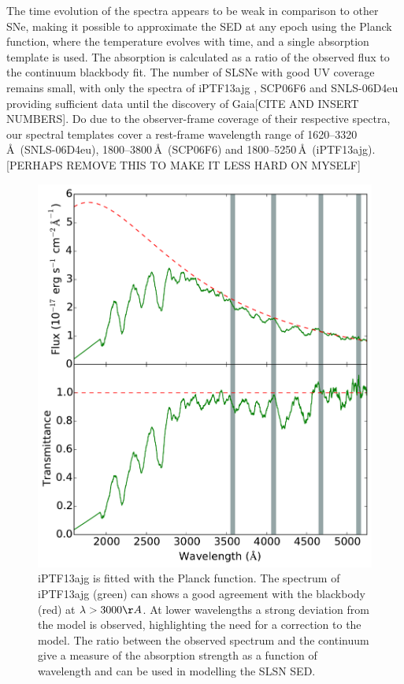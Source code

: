 The time evolution of the spectra appears to be weak in comparison to other SNe, making it possible to approximate the SED at any epoch using the Planck function, where the temperature evolves with time, and a single absorption template is used. The absorption is calculated as a ratio of the observed flux to the continuum blackbody fit. The number of SLSNe with good UV coverage remains small, with only the spectra of iPTF13ajg \citep{2014ApJ...797...24V}, SCP06F6 \citep{2009ApJ...690.1358B} and SNLS-06D4eu \citep{2013ApJ...779...98H} providing sufficient data until the discovery of Gaia[CITE AND INSERT NUMBERS]. Do due to the observer-frame coverage of their respective spectra, our spectral templates cover a rest-frame wavelength range of 1620--3320\,\AA\ (SNLS-06D4eu), 1800--3800\,\AA\ (SCP06F6) and 1800--5250\,\AA\ (iPTF13ajg). [PERHAPS REMOVE THIS TO MAKE IT LESS HARD ON MYSELF]
\begin{figure}
\centering
\includegraphics[width=\textwidth]{Figures/Chapter4/specTemplate}
\caption{iPTF13ajg is fitted with the Planck function. The spectrum of iPTF13ajg (green) can shows a good agreement with the blackbody (red) at $\lambda>3000\AA$. At lower wavelengths a strong deviation from the model is observed, highlighting the need for a correction to the model. The ratio between the observed spectrum and the continuum give a measure of the absorption strength as a function of wavelength and can be used in modelling the SLSN SED.}
\label{fig:specTemplate}
\end{figure}

